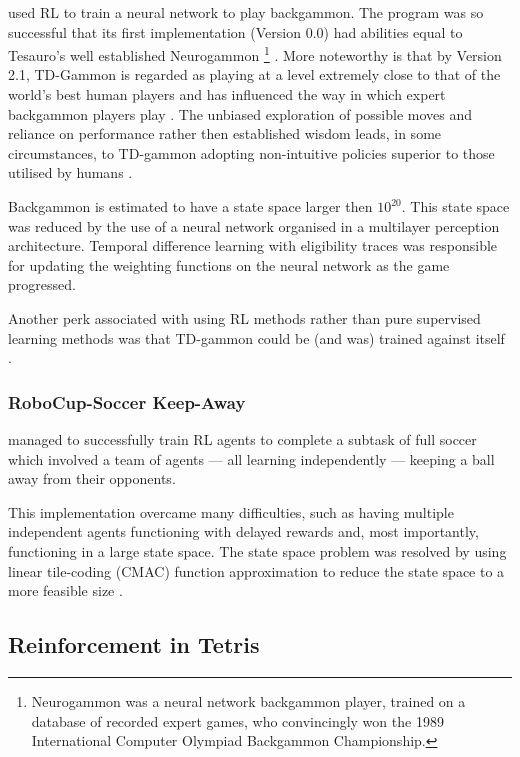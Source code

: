 \documentclass{rucsthesis}
\begin{document}
 \cite{tdgammon} used RL to train a neural network to play backgammon. The program was so successful that its first implementation (Version 0.0) had abilities equal to Tesauro's well established Neurogammon \footnote{Neurogammon was a neural network backgammon player, trained on a database of recorded expert games, who convincingly won the 1989 International Computer Olympiad Backgammon Championship.} \citep{tdgammon}.  More noteworthy is that by Version 2.1, TD-Gammon is regarded as playing at a level extremely close to that of the world's best human players and has influenced the way in which expert backgammon players play \citep{tdgammon}. The unbiased exploration of possible moves and reliance on performance rather then established wisdom leads, in some circumstances, to TD-gammon adopting non-intuitive policies superior to those utilised by humans \citep{tdgammon}.

Backgammon is estimated to have a state space larger then $10^{20}$. This state space was reduced by the use of a neural network organised in a multilayer perception architecture. Temporal difference learning with eligibility traces was responsible for updating the weighting functions on the neural network as the game progressed. 

Another perk associated with using RL methods rather than pure supervised learning methods was that TD-gammon could be (and was) trained against itself \citep{tdgammon}.

\subsubsection{RoboCup-Soccer Keep-Away}

\cite{keepaway} managed to successfully train RL agents to complete a subtask of full soccer which involved a team of agents --- all learning independently --- keeping a ball away from their opponents. 

This implementation overcame many difficulties, such as having multiple independent agents functioning with delayed rewards and, most importantly, functioning in a large state space. The state space problem was resolved by using linear tile-coding (CMAC) function approximation to reduce the state space to a more feasible size \citep{keepaway}.

\subsection{Reinforcement in Tetris}
\end{document}
